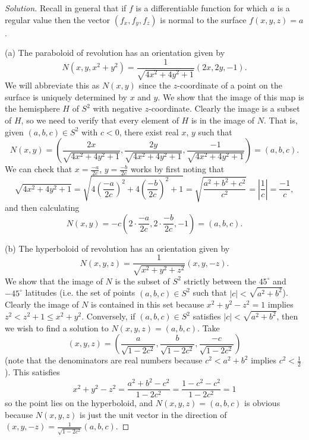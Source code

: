 \documentclass[10pt]{scrartcl}
\providecommand{\half}{\frac{1}{2}}
\providecommand{\dg}{^\circ}
\newenvironment{soln}{\begin{proof}[Solution]}{\end{proof}}
\providecommand{\abs}[1]{\left|#1\right|}
\begin{document}
\begin{soln}
	Recall in general that if $f$ is a differentiable function
	for which $a$ is a regular value then the vector $(f_x,f_y,f_z)$
	is normal to the surface $f(x,y,z)=a$.
	
	(a) The paraboloid of revolution has an orientation given by
	\[N(x,y,x^2+y^2) = \frac{1}{\sqrt{4x^2+4y^2+1}}(2x,2y,-1).\]
	We will abbreviate this as $N(x,y)$ since the $z$-coordinate
	of a point on the surface is uniquely determined by $x$ and $y$.
	We show that the image of this map is the hemisphere $H$ of $S^2$
	with negative $z$-coordinate.
	Clearly the image is a subset of $H$, so we need to verify
	that every element of $H$ is in the image of $N$.
	That is, given $(a,b,c)\in S^2$ with $c<0$, there exist real $x$, $y$
	such that
	\[N(x,y) = \left(\frac{2x}{\sqrt{4x^2+4y^2+1}},
	\frac{2y}{\sqrt{4x^2+4y^2+1}},
	\frac{-1}{\sqrt{4x^2+4y^2+1}} \right)=(a,b,c).\]
	We can check that $x = \frac{-a}{2c}$,
	$y = \frac{-b}{2c}$ works by first noting that
	\[\sqrt{4x^2 + 4y^2 + 1} =
	\sqrt{4\left(\frac{-a}{2c}\right)^2 + 4\left(\frac{-b}{2c}\right)^2 + 1}
	= \sqrt{\frac{a^2+b^2+c^2}{c^2}} = \abs{\frac{1}{c}} = \frac{-1}{c},\]
	and then calculating
	\[N(x,y) = -c\left(2\cdot \frac{-a}{2c}, 2\cdot\frac{-b}{2c}, -1\right)
	= (a,b,c).\]
	
	(b) The hyperboloid of revolution has an orientation given by
	\[N(x,y,z) = \frac{1}{\sqrt{x^2+y^2+z^2}}(x,y,-z).\]
	We show that the image of $N$ is the subset of $S^2$
	strictly between the $45\dg$ and $-45\dg$ latitudes
	(i.e. the set of points $(a,b,c)\in S^2$ such that $|c|<\sqrt{a^2 + b^2}$).
	Clearly the image of $N$ is contained in this set
	because $x^2 + y^2 - z^2 = 1$ implies $z^2 < z^2 + 1\le x^2 + y^2$.
	Conversely, if $(a,b,c)\in S^2$ satisfies $|c|<\sqrt{a^2+b^2}$,
	then we wish to find a solution to $N(x,y,z)=(a,b,c)$.
	Take
	\[(x,y,z) = \left(\frac{a}{\sqrt{1-2c^2}}, \frac{b}{\sqrt{1-2c^2}},
	\frac{-c}{\sqrt{1-2c^2}}\right)\]
	(note that the denominators are real numbers because
	$c^2 < a^2 + b^2$ implies $c^2 < \half$).
	This satisfies
	\[x^2+y^2-z^2 = \frac{a^2+b^2-c^2}{1-2c^2} = \frac{1-c^2-c^2}{1-2c^2} = 1\]
	so the point lies on the hyperboloid, and
	$N(x,y,z)=(a,b,c)$ is obvious because $N(x,y,z)$ is just the unit vector
	in the direction of $(x,y,-z) = \frac{1}{\sqrt{1-2c^2}}(a,b,c)$.
	

\end{soln}
\end{document}
